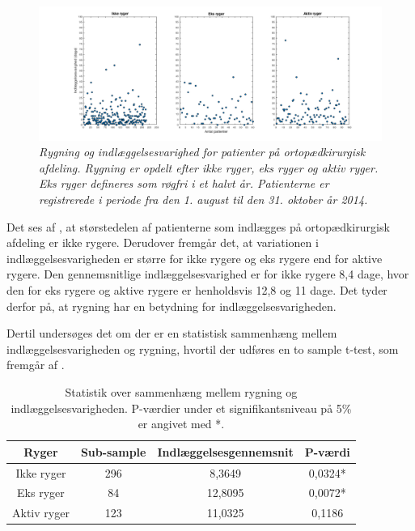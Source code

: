 \begin{figure}[H]
	\centering
	\includegraphics[scale=0.35]{figures/rygerogindlaeg}
	\caption{\textit{Rygning og indlæggelsesvarighed for patienter på ortopædkirurgisk afdeling. Rygning er opdelt efter ikke ryger, eks ryger og aktiv ryger. Eks ryger defineres som røgfri i et halvt år. Patienterne er registrerede i periode fra den 1. august til den 31. oktober år 2014.}}
	\label{rygningogindlaeggelse}
\end{figure}


\noindent
Det ses af , at størstedelen af patienterne som indlægges på ortopædkirurgisk afdeling er ikke rygere. Derudover fremgår det, at variationen i indlæggelsesvarigheden er større for ikke rygere og eks rygere end for aktive rygere. Den gennemsnitlige indlæggelsesvarighed er for ikke rygere 8,4 dage, hvor den for eks rygere og aktive rygere er henholdsvis 12,8 og 11 dage. Det tyder derfor på, at rygning har en betydning for indlæggelsesvarigheden. 

Dertil undersøges det om der er en statistisk sammenhæng mellem indlæggelsesvarigheden og rygning, hvortil der udføres en to sample t-test, som fremgår af .

\begin{table}[H]
\centering
\begin{tabular}{|c|c|c|c|}
\hline
\textbf{Ryger} & \textbf{Sub-sample} & \textbf{Indlæggelsesgennemsnit} & \textbf{P-værdi} \\ \hline
Ikke ryger        & 296                 & 8,3649                          & 0,0324*          \\ \hline
Eks ryger         & 84                  & 12,8095                         & 0,0072*          \\ \hline
Aktiv ryger             & 123                 & 11,0325                         & 0,1186           \\ \hline
\end{tabular}
\caption{Statistik over sammenhæng mellem rygning og indlæggelsesvarigheden. P-værdier under et signifikantsniveau på 5\% er angivet med *.}
\label{rygerindlaegtab}
\end{table}

